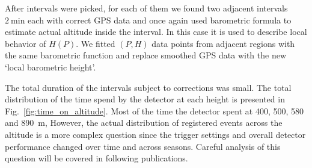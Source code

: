 \documentclass[final,5p,times,twocolumn]{elsarticle}
\begin{document}
After intervals were picked, for each of them we found two adjacent intervals $2~\textrm{min}$ each with correct GPS data and once again used barometric formula to estimate actual altitude inside the interval. In this case it is used to describe local behavior of $H(P)$. We fitted $(P, H)$ data points from adjacent regions with the same barometric function and replace smoothed GPS data with the new `local barometric height'.

The total duration of the intervals subject to corrections was small. The total distribution of the time spend by the detector at each height is presented in Fig.~\ref{fig:time_on_altitude}. Most of the time the detector spent at 400, 500, 580 and 890~m, However, the actual distribution of registered events across the altitude is a more complex question since the trigger settings and overall detector performance changed over time and across seasons. Careful analysis of this question will be covered in following publications.
\end{document}
